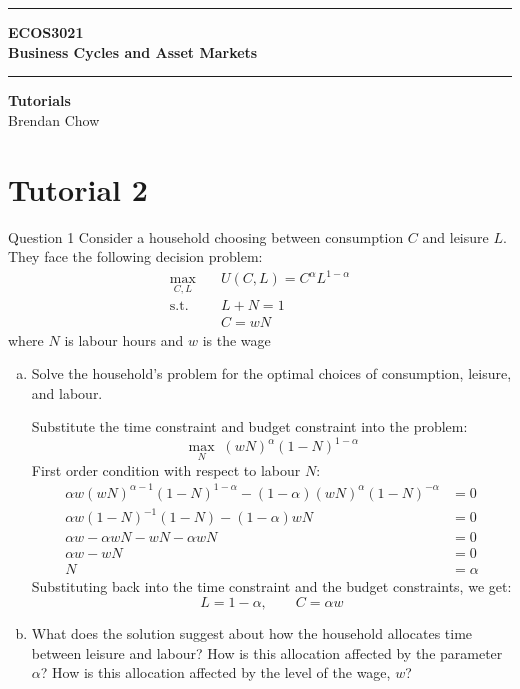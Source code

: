 \documentclass[a4paper]{article}
\newif\IfInSansMode
\begin{document}
\begin{titlepage}
	\centering
	\vspace*{4.5cm}
	\rule{\linewidth}{2pt}
	\LARGE\textbf{ECOS3021}\\
	\vspace{0.5cm}
	\Huge\textbf{Business Cycles and Asset Markets}\\
	\rule{\linewidth}{2pt}
	\LARGE\textbf{Tutorials}\\
	\vspace{1.5cm}
	\Large Brendan Chow
	\vfill
\end{titlepage}

\section{Tutorial 2}
	\begin{questionbox}{Question 1}
		Consider a household choosing between consumption \( C \) and leisure \( L \). They face the following decision problem:
		\begin{align*}
			\max_{C,L}\quad &U(C,L) = C^\alpha L^{1-\alpha}\\
			\text{s.t.}\quad &L + N = 1\\
			& C = wN
		\end{align*}
		where \( N \) is labour hours and \( w \) is the wage
		\begin{enumerate}[(a)]
			\item Solve the household's problem for the optimal choices of consumption, leisure, and labour.
			\begin{explanationbox}
				Substitute the time constraint and budget constraint into the problem:
				\[
					\max_N\;(wN)^\alpha(1-N)^{1-\alpha}
				\]
				First order condition with respect to labour \( N \):
				\begin{align*}
					\alpha w(wN)^{\alpha-1} (1-N)^{1-\alpha} - (1-\alpha)(wN)^\alpha (1-N)^{-\alpha} &= 0\\
					\alpha w (1-N)^{-1} (1-N) - (1-\alpha)wN &= 0\\
					\alpha w - \alpha wN - wN - \alpha wN &=0\\
					\alpha w - wN &= 0\\
					N &= \alpha
				\end{align*}
				Substituting back into the time constraint and the budget constraints, we get:
				\[
					L = 1 - \alpha, \qquad C=\alpha w
				\]
			\end{explanationbox}
			\item What does the solution suggest about how the household allocates time between leisure and labour? How is this allocation affected by the parameter \( \alpha \)? How is this allocation affected by the level of the wage, \( w \)? 

\end{enumerate}
\end{questionbox}
\end{document}
